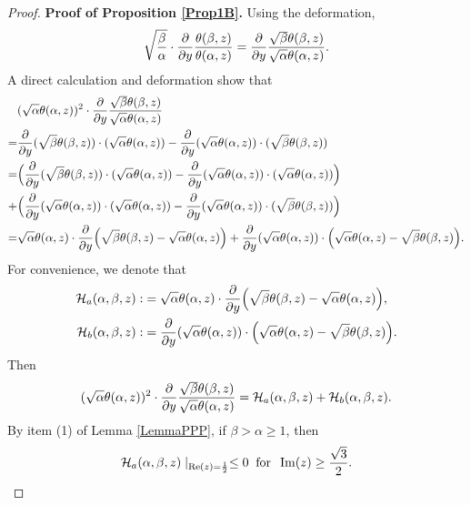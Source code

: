 \documentclass[reqno,english]{amsart}
\newtheorem{open problem}{Open Problem}[section]
\newtheorem{open question}{Open Question}[section]
\newtheorem{open questions on hexagonal lattice}{Open Questions on hexagonal lattice}[section]
\renewcommand{\Re}{\operatorname{Re}}
\renewcommand{\Im}{\operatorname{Im}}
\begin{document}
\begin{proof}{\bf Proof of Proposition \ref{Prop1B}.} Using the deformation,
\begin{equation}\aligned\nonumber
\sqrt{\frac{\beta}{\alpha}}\cdot\frac{\partial}{\partial y}\frac{\theta(\beta,z)}{\theta(\alpha,z)}
=\frac{\partial}{\partial y}\frac{\sqrt{\beta}\theta(\beta,z)}{\sqrt{\alpha}\theta(\alpha,z)}.
\endaligned\end{equation}
A direct calculation and deformation show that
\begin{equation}\aligned\nonumber
&(\sqrt{\alpha}\theta(\alpha,z))^2\cdot\frac{\partial}{\partial y}\frac{\sqrt{\beta}\theta(\beta,z)}{\sqrt{\alpha}\theta(\alpha,z)}\\
=&\frac{\partial}{\partial y}(\sqrt{\beta}\theta(\beta,z))\cdot(\sqrt{\alpha}\theta(\alpha,z))
-\frac{\partial}{\partial y}(\sqrt{\alpha}\theta(\alpha,z))\cdot(\sqrt{\beta}\theta(\beta,z))\\
=&\Big(\frac{\partial}{\partial y}(\sqrt{\beta}\theta(\beta,z))\cdot(\sqrt{\alpha}\theta(\alpha,z))
-\frac{\partial}{\partial y}(\sqrt{\alpha}\theta(\alpha,z))\cdot(\sqrt{\alpha}\theta(\alpha,z))\Big)\\
+&\Big(\frac{\partial}{\partial y}(\sqrt{\alpha}\theta(\alpha,z))\cdot(\sqrt{\alpha}\theta(\alpha,z))
-\frac{\partial}{\partial y}(\sqrt{\alpha}\theta(\alpha,z))\cdot(\sqrt{\beta}\theta(\beta,z))\Big)\\
=&\sqrt{\alpha}\theta(\alpha,z)\cdot\frac{\partial}{\partial y}\Big(\sqrt{\beta}\theta(\beta,z)-\sqrt{\alpha}\theta(\alpha,z)\Big)
+\frac{\partial}{\partial y}(\sqrt{\alpha}\theta(\alpha,z))\cdot\Big(\sqrt{\alpha}\theta(\alpha,z)-\sqrt{\beta}\theta(\beta,z)\Big).
\endaligned\end{equation}
For convenience, we denote that
\begin{equation}\aligned\nonumber
\mathcal{H}_a(\alpha,\beta,z):&=\sqrt{\alpha}\theta(\alpha,z)\cdot\frac{\partial}{\partial y}\Big(\sqrt{\beta}\theta(\beta,z)-\sqrt{\alpha}\theta(\alpha,z)\Big),\\
\mathcal{H}_b(\alpha,\beta,z):&=\frac{\partial}{\partial y}(\sqrt{\alpha}\theta(\alpha,z))\cdot\Big(\sqrt{\alpha}\theta(\alpha,z)-\sqrt{\beta}\theta(\beta,z)\Big).
\endaligned\end{equation}
Then
\begin{equation}\aligned\nonumber
(\sqrt{\alpha}\theta(\alpha,z))^2\cdot\frac{\partial}{\partial y}\frac{\sqrt{\beta}\theta(\beta,z)}{\sqrt{\alpha}\theta(\alpha,z)}
=\mathcal{H}_a(\alpha,\beta,z)+\mathcal{H}_b(\alpha,\beta,z).
\endaligned\end{equation}
By item (1) of Lemma \ref{LemmaPPP}, if $\beta>\alpha\geq1$, then
\begin{equation}\aligned\nonumber
\mathcal{H}_a(\alpha,\beta,z)\mid_{\Re(z)=\frac{1}{2}}\leq0\;\;\hbox{for}\;\;\Im(z)\geq\frac{\sqrt3}{2}.
\endaligned\end{equation}



\end{proof}
\end{document}
